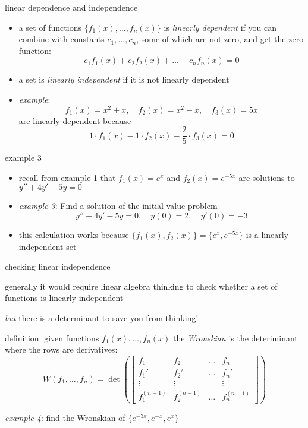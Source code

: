 \documentclass{beamer}
\begin{document}
\begin{frame}{linear dependence and independence}

\begin{itemize}
\item a set of functions $\{f_1(x),\dots,f_n(x)\}$ is \emph{linearly dependent} if you can combine with constants $c_1,\dots,c_n$, \underline{some of which} \underline{are not zero}, and get the zero function:
    $$c_1 f_1(x) + c_2 f_2(x) + \dots + c_n f_n(x) = 0$$
\item a set is \emph{linearly independent} if it is not linearly dependent
\item \emph{example}:
    $$f_1(x) = x^2 + x, \quad f_2(x) = x^2 - x, \quad f_3(x) = 5x$$
are linearly dependent because
    $$1\cdot f_1(x) - 1\cdot f_2(x) - \frac{2}{5}\cdot f_3(x) = 0$$
\end{itemize}
\end{frame}


\begin{frame}{example 3}

\begin{itemize}
\item recall from example 1 that $f_1(x)=e^x$ and $f_2(x)=e^{-5x}$ are solutions to $y'' + 4 y' - 5 y = 0$
\item \emph{example 3}:  Find a solution of the initial value problem
    $$y'' + 4 y' - 5 y = 0, \quad y(0) = 2, \quad y'(0) = -3$$

\vspace{35mm}
\item this calculation works because $\{f_1(x),f_2(x)\}=\{e^x,e^{-5x}\}$ is a linearly-independent set
\end{itemize}
\end{frame}


\begin{frame}{checking linear independence}

\begin{itemize}
\item generally it would require linear algebra thinking to check whether a set of functions is linearly independent
\item \emph{but} there is a determinant to save you from thinking!
\item definition.  given functions $f_1(x),\dots,f_n(x)$ the \emph{Wronskian} is the deteriminant where the rows are derivatives:
    $$W(f_1,\dots,f_n) = \det \left(\begin{bmatrix}
    f_1 & f_2 & \dots & f_n \\
    f_1' & f_2' & \dots & f_n' \\
    \vdots & \vdots & & \vdots \\
    f_1^{(n-1)} & f_2^{(n-1)} & \dots & f_n^{(n-1)}
    \end{bmatrix}\right)$$
\begin{minipage}[t]{0.25\textwidth}
\item \emph{example 4}: find the Wronskian of $\{e^{-3x},e^{-x},e^{x}\}$
\end{minipage}

\vspace{15mm}
\end{itemize}
\end{frame}
\end{document}
